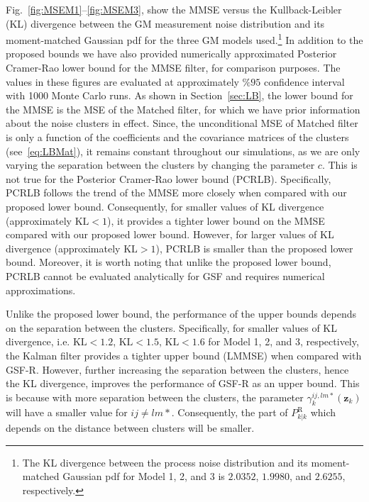 \documentclass[10pt,twocolumn,twoside]{IEEEtran}
\newcommand{\corcol}[1]{\textcolor{CorCol}{#1}}
\begin{document}
Fig.~\ref{fig:MSEM1}--\ref{fig:MSEM3}, show the MMSE versus the Kullback-Leibler (KL) divergence between the GM measurement noise distribution and its moment-matched Gaussian pdf for the three GM models used.\footnote{The KL divergence between the process noise distribution and its moment-matched Gaussian pdf for Model 1, 2, and 3 is \(2.0352\), \(1.9980\), and \(2.6255\), respectively.} \corcol{In addition to the proposed bounds we have also provided numerically approximated Posterior Cramer-Rao lower bound for the MMSE filter, for comparison purposes.} The values in these figures are evaluated at approximately \(\%95\) confidence interval with 1000 Monte Carlo runs. As shown in Section~\ref{sec:LB}, the lower bound for the MMSE is the MSE of the Matched filter, for which we have prior information about the noise clusters in effect. Since, the unconditional MSE of Matched filter is only a function of the coefficients and the covariance matrices of the clusters (see~\eqref{eq:LBMat}), it remains constant throughout our simulations, as we are only varying the separation between the clusters by changing the parameter \(c\). \corcol{This is not true for the Posterior Cramer-Rao lower bound (PCRLB). Specifically, PCRLB follows the trend of the MMSE more closely when compared with our proposed lower bound. Consequently, for smaller values of KL divergence (approximately \(\mathrm{KL}<1\)), it provides a tighter lower bound on the MMSE compared with our proposed lower bound. However, for larger values of KL divergence (approximately \(\mathrm{KL}>1\)), PCRLB is smaller than the proposed lower bound. Moreover, it is worth noting that unlike the proposed lower bound, PCRLB cannot be evaluated analytically for GSF and requires numerical approximations.} 

Unlike the proposed lower bound, the performance of the upper bounds depends on the separation between the clusters. Specifically, for smaller values of KL divergence, i.e. \(\mathrm{KL}<1.2\), \(\mathrm{KL}<1.5\), \(\mathrm{KL}<1.6\) for Model 1, 2, and 3, respectively, \corcol{the }Kalman filter provides a tighter upper bound (LMMSE) when compared with GSF-R. However, further increasing the separation between the clusters, hence the KL divergence, improves the performance of GSF-R as an upper bound. This is because with more separation between the clusters, the parameter \(\gamma_k^{ij,lm*}{\left(\mathbf{z}_{k}\right)}\) will have a smaller value for \(ij \neq lm*\). Consequently, the part of \(P_{k|k}^{\mathrm{R}}\) which depends on the distance between clusters will be smaller.
\end{document}
